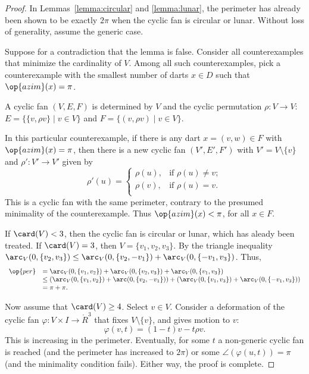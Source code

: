 \begin{proof} In Lemmas~\ref{lemma:circular} and \ref{lemma:lunar}, the perimeter has already been shown to be exactly $2\pi$ when the cyclic fan is circular or lunar.  Without loss of generality, assume the generic case.

Suppose for a contradiction that the lemma is false.  Consider all counterexamples
that minimize the cardinality of $V$.  Among all such counterexamples, pick a counterexample with the smallest number of darts $x\in D$ such that $\op{azim}(x) = \pi$.

A cyclic fan $(V,E,F)$ is determined by $V$ and the cyclic permutation $\rho:V\to V$:  $E=\{\{v,\rho v\}\mid v\in V\}$ and $F = \{(v,\rho v)\mid v\in V\}$.

In this particular counterexample, if there is any dart $x=(v,w)\in F$ with $\op{azim}(x)=\pi$, then there is a new cyclic fan $(V',E',F')$ with $V' = V\setminus\{v\}$ and $\rho':V'\to V'$ given by 
$$
\rho'(u) = \begin{cases}
\rho(u), & \text{if } \rho(u)\ne v;\\
\rho(v), & \text{if }\rho(u) = v.\\
\end{cases}
$$
This is a cyclic fan with the same perimeter, contrary to the presumed minimality of the counterexample.  Thus $\op{azim}(x) <\pi$, for all $x\in F$.

If $\card(V) <3$, then the cyclic fan is circular or lunar, which has aleady been treated.  If $\card(V)=3$, then $V=\{v_1,v_2,v_3\}$.  By the triangle inequality $\arc_V(0,\{v_2,v_3\}) \le \arc_V(0,\{v_2,-v_1\})+\arc_V(0,\{-v_1,v_3\})$.  Thus,
$$
\begin{array}{rll}
\op{per} &=\arc_V(0,\{v_1,v_2\}) + \arc_V(0,\{v_2,v_3\}) + \arc_V(0,\{v_1,v_3\})\\
&\le(\arc_V(0,\{v_1,v_2\})+\arc(0,\{v_2,-v_1\}))+(\arc_V(0,\{v_1,v_3\})+\arc_V(0,\{-v_1,v_3\})) \\
   &= \pi+\pi.
\end{array}
$$

Now assume that $\card(V)\ge 4$.  Select $v\in V$.  Consider a deformation of the cyclic fan $\varphi:V\times I \to \ring{R}^3$ that fixes $V\setminus\{v\}$, and gives motion to $v$:
$$
\varphi(v,t) = (1-t) v - t \rho v.
$$
This is increasing in the perimeter.  Eventually, for some $t$ a non-generic cyclic fan is reached (and the perimeter has increased to $2\pi$) or some $\angle(\varphi(u,t))=\pi$ (and the minimality condition fails).  Either way, the proof is complete. 
\end{proof}

